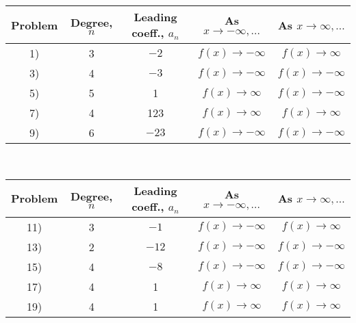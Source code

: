\documentclass[11pt]{book}
\newcommand{\tmstrong}[1]{\textbf{#1}}
\theoremstyle{definition}  %
\newcommand{\pp}{\par~\par}
\begin{document}
\begin{tabular}{c|cccc}
Problem & Degree, $n$ & Leading coeff., $a_n$ & As $x\rightarrow -\infty,...$ & As $x\rightarrow \infty,...$\\
\hline
1) & 3 & $-2$  & $f(x)\rightarrow -\infty$ & $f(x)\rightarrow \infty$\\ 
3) & 4 & $-3$  & $f(x)\rightarrow -\infty$ & $f(x)\rightarrow -\infty$\\ 
5) & 5 & 1     & $f(x)\rightarrow \infty$ & $f(x)\rightarrow -\infty$\\ 
7) & 4 & 123   & $f(x)\rightarrow \infty$ & $f(x)\rightarrow \infty$\\ 
9) & 6 & $-23$ & $f(x)\rightarrow -\infty$ & $f(x)\rightarrow -\infty$\\
\end{tabular}
~\\
 
\begin{tabular}{c|cccc}
Problem & Degree, $n$ & Leading coeff., $a_n$ & As $x\rightarrow -\infty,...$ & As $x\rightarrow \infty,...$\\
\hline
11) & 3 & $-1$  & $f(x)\rightarrow -\infty$ & $f(x)\rightarrow \infty$\\ 
13) & 2 & $-12$  & $f(x)\rightarrow -\infty$ & $f(x)\rightarrow -\infty$\\ 
15) & 4 & $-8$ & $f(x)\rightarrow -\infty$ & $f(x)\rightarrow -\infty$\\ 
17) & 4 & 1  & $f(x)\rightarrow \infty$ & $f(x)\rightarrow \infty$\\ 
19) & 4 & 1 & $f(x)\rightarrow \infty$ & $f(x)\rightarrow \infty$\\
\end{tabular}
\end{document}
